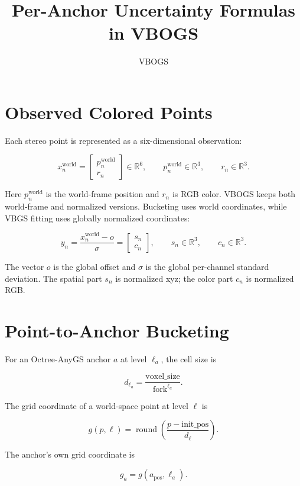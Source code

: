 \documentclass[11pt]{article}
\title{Per-Anchor Uncertainty Formulas in VBOGS}
\author{VBOGS}
\date{}
\newcommand{\R}{\mathbb{R}}
\begin{document}
\maketitle

\section{Observed Colored Points}

Each stereo point is represented as a six-dimensional observation:

\[
  x_n^{\mathrm{world}}
  =
  \begin{bmatrix}
    p_n^{\mathrm{world}} \\
    r_n
  \end{bmatrix}
  \in \R^6,
  \qquad
  p_n^{\mathrm{world}} \in \R^3,
  \qquad
  r_n \in \R^3.
\]

Here \(p_n^{\mathrm{world}}\) is the world-frame position and \(r_n\) is RGB
color. VBOGS keeps both world-frame and normalized versions. Bucketing uses
world coordinates, while VBGS fitting uses globally normalized coordinates:

\[
  y_n
  =
  \frac{x_n^{\mathrm{world}} - o}{\sigma}
  =
  \begin{bmatrix}
    s_n \\
    c_n
  \end{bmatrix},
  \qquad
  s_n \in \R^3,
  \qquad
  c_n \in \R^3.
\]

The vector \(o\) is the global offset and \(\sigma\) is the global per-channel
standard deviation. The spatial part \(s_n\) is normalized xyz; the color part
\(c_n\) is normalized RGB.

\section{Point-to-Anchor Bucketing}

For an Octree-AnyGS anchor \(a\) at level \(\ell_a\), the cell size is

\[
  d_{\ell_a}
  =
  \frac{\mathrm{voxel\_size}}{\mathrm{fork}^{\ell_a}}.
\]

The grid coordinate of a world-space point at level \(\ell\) is

\[
  g(p,\ell)
  =
  \operatorname{round}
  \left(
    \frac{p - \mathrm{init\_pos}}{d_\ell}
  \right).
\]

The anchor's own grid coordinate is

\[
  g_a
  =
  g(a_{\mathrm{pos}}, \ell_a).
\]
\end{document}
